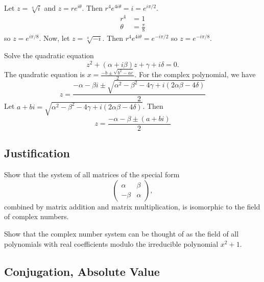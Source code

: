 \begin{exercise}
  Let \(z = \sqrt[4]{i}\) and \(z = re^{i\theta}\).
  Then \(r^4e^{4i\theta} = i = e^{i\pi/2}\).
    \begin{align*}
      r^4 & = 1\\
      \theta & = \frac{\pi}{8}
    \end{align*}
    so \(z = e^{i\pi/8}\).
    Now, let \(z = \sqrt[4]{-i}\).
    Then \(r^4e^{4i\theta} = e^{-i\pi/2}\) so \(z = e^{-i\pi/8}\).
\item
  Solve the quadratic equation
  \[
  z^2 + (\alpha + i\beta)z + \gamma + i\delta = 0.
  \]
  The quadratic equation is \(x = \frac{-b\pm\sqrt{b^2 - ac}}{2}\).
  For the complex polynomial, we have
  \[
  z = \frac{-\alpha - \beta i\pm
    \sqrt{\alpha^2 - \beta^2 - 4\gamma + i(2\alpha\beta - 4\delta)}}{2}
  \]
  Let
  \(a + bi = \sqrt{\alpha^2 - \beta^2 - 4\gamma + i(2\alpha\beta - 4\delta)}\).
  Then
  \[
  z = \frac{-\alpha - \beta\pm (a + bi)}{2}
  \]
\end{exercise}

\subsection{Justification}

\begin{exercise}
\item
  Show that the system of all matrices of the special form
  \[
  \begin{pmatrix}
    \alpha & \beta\\
    -\beta & \alpha
  \end{pmatrix},
  \]
  combined by matrix addition and matrix multiplication, is isomorphic to the
  field of complex numbers.
\item
  Show that the complex number system can be thought of as the field of all
  polynomials with real coefficients modulo the irreducible polynomial
  \(x^2 + 1\).
\end{exercise}

\subsection{Conjugation, Absolute Value}


